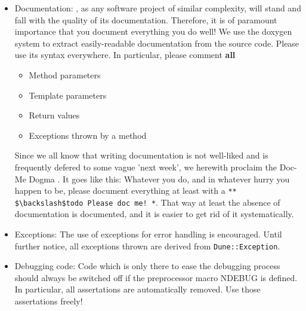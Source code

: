 \begin{itemize}
\item Documentation: \eWoms, as any software project of similar
  complexity, will stand and fall with the quality of its
  documentation.  Therefore, it is of paramount importance that you
  document everything you do well! We use the doxygen system to
  extract easily-readable documentation from the source code. Please
  use its syntax everywhere. In particular, please comment
  \textbf{all}
\begin{itemize}
\item Method parameters
\item Template parameters
\item Return values
\item Exceptions thrown by a method
 \end{itemize}
 Since we all know that writing documentation is not well-liked and is
 frequently defered to some vague 'next week', we herewith proclaim
 the Doc-Me Dogma . It goes like this: Whatever you do, and in
 whatever hurry you happen to be, please document everything at least
 with a {\verb /** $\backslash$todo Please doc me! */}. That way at
 least the absence of documentation is documented, and it is easier to
 get rid of it systematically.
\item Exceptions: The use of exceptions for error handling is
  encouraged. Until further notice, all exceptions thrown are derived
  from \texttt{Dune::Exception}.
\item Debugging code: Code which is only there to ease the debugging
  process should always be switched off if the preprocessor macro
  NDEBUG is defined. In particular, all assertations are automatically
  removed. Use those assertations freely!
\end{itemize}

